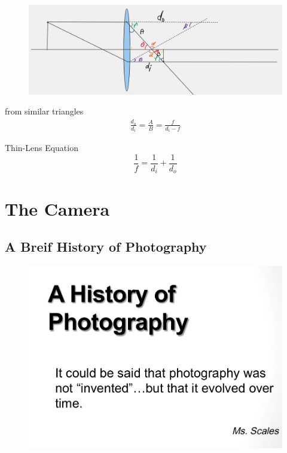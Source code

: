 \documentclass{beamer}
\begin{document}
\begin{frame}
	\begin{figure}
		\centering
		\includegraphics[scale=0.1]{60.png}
	\end{figure}
	from similar triangles
	\begin{align*}
		\frac{d_{o}}{d_{i}} = \frac{A}{B} = \frac{f}{d_{i} - f} 
	\end{align*}
	\begin{block}{Thin-Lens Equation}
		\begin{displaymath}
			\frac{1}{f} = \frac{1}{d_{i}} + \frac{1}{d_{o}}
		\end{displaymath}
		
	\end{block}
\end{frame}



\section{The Camera}
\subsection{A Breif History of Photography}
\begin{frame}
	\begin{figure}
		\centering
		\includegraphics[scale=0.4]{63.jpg}
	\end{figure}
\end{frame}
\end{document}
